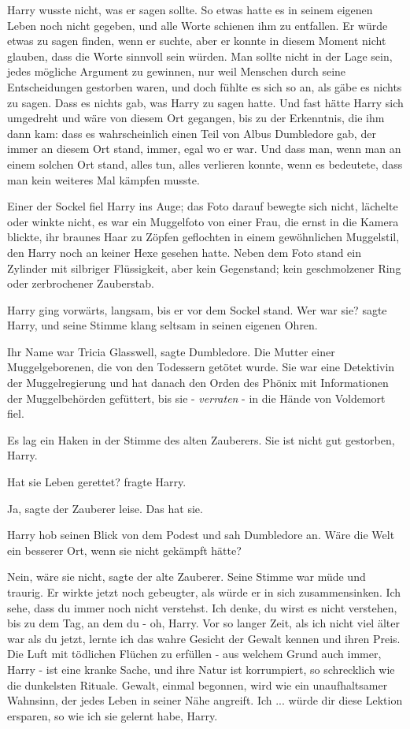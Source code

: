 Harry wusste nicht, was er sagen sollte. So etwas hatte es in seinem eigenen
Leben noch nicht gegeben, und alle Worte schienen ihm zu entfallen. Er würde
etwas zu sagen finden, wenn er suchte, aber er konnte in diesem Moment nicht
glauben, dass die Worte sinnvoll sein würden. Man sollte nicht in der Lage sein,
jedes mögliche Argument zu gewinnen, nur weil Menschen durch seine
Entscheidungen gestorben waren, und doch fühlte es sich so an, als gäbe es
nichts zu sagen. Dass es nichts gab, was Harry zu sagen hatte. Und fast hätte
Harry sich umgedreht und wäre von diesem Ort gegangen, bis zu der Erkenntnis,
die ihm dann kam: dass es wahrscheinlich einen Teil von Albus Dumbledore gab,
der immer an diesem Ort stand, immer, egal wo er war. Und dass man, wenn man an
einem solchen Ort stand, alles tun, alles verlieren konnte, wenn es bedeutete,
dass man kein weiteres Mal kämpfen musste.

Einer der Sockel fiel Harry ins Auge; das Foto darauf bewegte sich nicht,
lächelte oder winkte nicht, es war ein Muggelfoto von einer Frau, die ernst in
die Kamera blickte, ihr braunes Haar zu Zöpfen geflochten in einem gewöhnlichen
Muggelstil, den Harry noch an keiner Hexe gesehen hatte. Neben dem Foto stand
ein Zylinder mit silbriger Flüssigkeit, aber kein Gegenstand; kein geschmolzener
Ring oder zerbrochener Zauberstab.

Harry ging vorwärts, langsam, bis er vor dem Sockel stand. \glqq{}Wer war
sie?\grqq{} sagte Harry, und seine Stimme klang seltsam in seinen eigenen Ohren.

\glqq{}Ihr Name war Tricia Glasswell\grqq{}, sagte Dumbledore. \glqq{}Die Mutter
einer Muggelgeborenen, die von den Todessern getötet wurde. Sie war eine
Detektivin der Muggelregierung und hat danach den Orden des Phönix mit
Informationen der Muggelbehörden gefüttert, bis sie - \emph{verraten} - in die
Hände von Voldemort fiel.\grqq{}

Es lag ein Haken in der Stimme des alten Zauberers. \glqq{}Sie ist nicht gut
gestorben, Harry.\grqq{}

\glqq{}Hat sie Leben gerettet?\grqq{} fragte Harry.

\glqq{}Ja\grqq{}, sagte der Zauberer leise. \glqq{}Das hat sie.\grqq{}

Harry hob seinen Blick von dem Podest und sah Dumbledore an. \glqq{}Wäre die Welt
ein besserer Ort, wenn sie nicht gekämpft hätte?\grqq{}

\glqq{}Nein, wäre sie nicht\grqq{}, sagte der alte Zauberer. Seine Stimme war
müde und traurig. Er wirkte jetzt noch gebeugter, als würde er in sich
zusammensinken. \glqq{}Ich sehe, dass du immer noch nicht verstehst. Ich denke,
du wirst es nicht verstehen, bis zu dem Tag, an dem du - oh, Harry. Vor so
langer Zeit, als ich nicht viel älter war als du jetzt, lernte ich das wahre
Gesicht der Gewalt kennen und ihren Preis. Die Luft mit tödlichen Flüchen zu
erfüllen - aus welchem Grund auch immer, Harry - ist eine kranke Sache, und ihre
Natur ist korrumpiert, so schrecklich wie die dunkelsten Rituale. Gewalt, einmal
begonnen, wird wie ein unaufhaltsamer Wahnsinn, der jedes Leben in seiner Nähe
angreift. Ich ... würde dir diese Lektion ersparen, so wie ich sie gelernt habe,
Harry.\grqq{}

